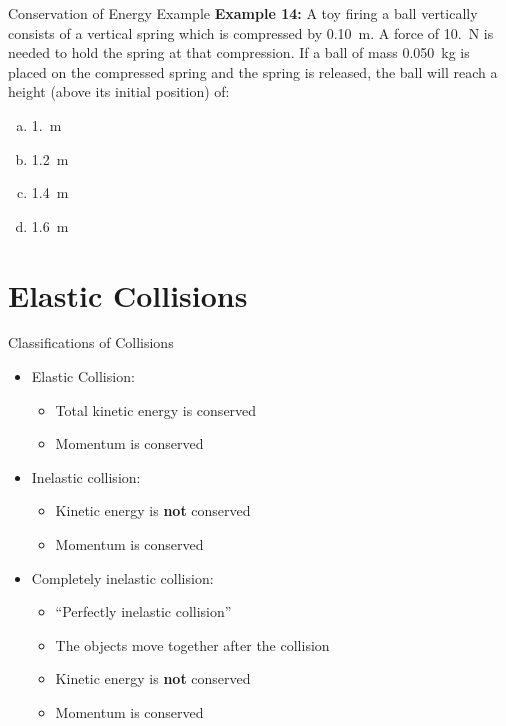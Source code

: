 \documentclass[12pt,compress,aspectratio=169]{beamer}
\begin{document}
\begin{frame}{Conservation of Energy Example}
  \textbf{Example 14:} A toy firing a ball vertically consists of a vertical
  spring which is compressed by \SI{.10}{\metre}. A force of \SI{10.}{\newton}
  is needed to hold the spring at that compression. If a ball of mass
  \SI{.050}{\kilo\gram} is placed on the compressed spring and the spring is
  released, the ball will reach a height (above its initial position) of:
  \begin{enumerate}[(a)]
  \item \SI{1.}{\metre}
  \item \SI{1.2}{\metre}
  \item \SI{1.4}{\metre}
  \item \SI{1.6}{\metre}
  \end{enumerate}
\end{frame}


\section{Elastic Collisions}

\begin{frame}{Classifications of Collisions}
  \begin{itemize}
  \item Elastic Collision:
    \begin{itemize}
    \item Total kinetic energy is conserved
    \item<alert@2> Momentum is conserved
    \end{itemize}
  \item Inelastic collision:
    \begin{itemize}
    \item Kinetic energy is \textbf{not} conserved
    \item<alert@2> Momentum is conserved
    \end{itemize}
  \item Completely inelastic collision:
    \begin{itemize}
    \item ``Perfectly inelastic collision''
    \item The objects move together after the collision
    \item Kinetic energy is \textbf{not} conserved
    \item<alert@2> Momentum is conserved
    \end{itemize}
  \end{itemize}
\end{frame}
\end{document}
